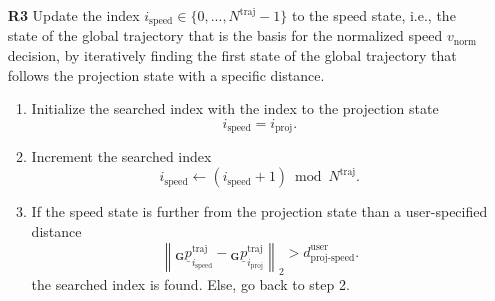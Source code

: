 \begin{itemize}
    
    \item [\textbf{R3}] 
    Update the index 
    $i_\text{speed} \in \{0, ..., N^\text{traj}-1\}$ 
    to the speed state,
    i.e., the state of the global trajectory
    that is the basis for the normalized speed
    $v_\text{norm}$  decision,
    by iteratively finding the first state of the global trajectory 
    that follows the projection state
    with a specific distance.
    \begin{enumerate}
        \item Initialize the searched index with the index to the projection state
        \begin{equation}
            i_\text{speed} = i_\text{proj}.
        \end{equation}
        \item Increment the searched index
        \begin{equation}
            i_\text{speed} \leftarrow (i_\text{speed} + 1) \bmod N^\text{traj}.
        \end{equation}
        \item If the speed state is further 
        from the projection state than a user-specified distance
        \begin{equation}
            \left\| 
                {}_\textbf{G} \underline p^\text{traj}_{i_\text{speed}} 
                - 
                {}_\textbf{G} \underline p^\text{traj}_{i_\text{proj}} 
            \right\|_2
            > 
            d^\text{user}_\text{proj-speed}.
        \end{equation}
        the searched index is found.
        Else, go back to step 2.
    \end{enumerate}



\end{itemize}
